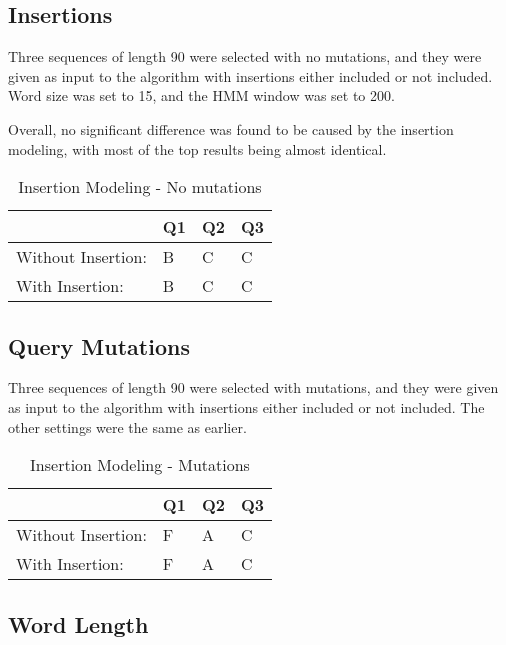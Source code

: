 \documentclass[12pt, conference]{IEEEtran}
\begin{document}
	\subsection{\textbf{Insertions}}
	
	Three sequences of length 90 were selected with no mutations, and they were given as input to the algorithm with insertions either included or not included. Word size was set to 15, and the HMM window was set to 200.
	
	Overall, no significant difference was found to be caused by the insertion modeling, with most of the top results being almost identical.
	
	
	\begin{table}[htbp]
	\centering
	\caption{Insertion Modeling - No mutations}
	\label{insmod}
	\begin{tabular}{|l|l|l|l|}
	\hline
										 & Q1 & Q2 & Q3 \\ \hline
	Without Insertion: & B  & C  & C  \\ \hline
	With Insertion:    & B  & C  & C  \\ \hline
	\end{tabular}
	\end{table}
	
	\subsection{\textbf{Query Mutations}}
	
	Three sequences of length 90 were selected with mutations, and they were given as input to the algorithm with insertions either included or not included. The other settings were the same as earlier.
	
	\begin{table}[htbp]
	\centering
	\caption{Insertion Modeling - Mutations}
	\label{muts}
	\begin{tabular}{|l|l|l|l|}
	\hline
										 & Q1 & Q2 & Q3 \\ \hline
	Without Insertion: & F  & A  & C  \\ \hline
	With Insertion:    & F  & A  & C  \\ \hline
	\end{tabular}
	\end{table}
	
	\subsection{\textbf{Word Length}}
	
\end{document}
